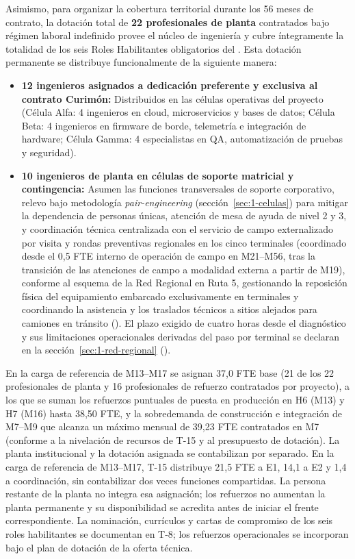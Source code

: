 \noindent Asimismo, para organizar la cobertura territorial durante los 56 meses de contrato, la dotación total de \textbf{22 profesionales de planta} contratados bajo régimen laboral indefinido provee el núcleo de ingeniería y cubre íntegramente la totalidad de los seis Roles Habilitantes obligatorios del . Esta dotación permanente se distribuye funcionalmente de la siguiente manera:
\begin{itemize}
  \item \textbf{12 ingenieros asignados a dedicación preferente y exclusiva al contrato Curimón:} Distribuidos en las células operativas del proyecto (Célula Alfa: 4 ingenieros en cloud, microservicios y bases de datos; Célula Beta: 4 ingenieros en firmware de borde, telemetría e integración de hardware; Célula Gamma: 4 especialistas en QA, automatización de pruebas y seguridad).
  \item \textbf{10 ingenieros de planta en células de soporte matricial y contingencia:} Asumen las funciones transversales de soporte corporativo, relevo bajo metodología \textit{pair-engineering} (sección~\ref{sec:1-celulas}) para mitigar la dependencia de personas únicas, atención de mesa de ayuda de nivel 2 y 3, y coordinación técnica centralizada con el servicio de campo externalizado por visita y rondas preventivas regionales en los cinco terminales (coordinado desde el 0,5 FTE interno de operación de campo en M21--M56, tras la transición de las atenciones de campo a modalidad externa a partir de M19), conforme al esquema de la Red Regional en Ruta 5, gestionando la reposición física del equipamiento embarcado exclusivamente en terminales y coordinando la asistencia y los traslados técnicos a sitios alejados para camiones en tránsito (). El plazo exigido de cuatro horas desde el diagnóstico y sus limitaciones operacionales derivadas del paso por terminal se declaran en la sección~\ref{sec:1-red-regional} ().
\end{itemize}
En la carga de referencia de M13--M17 se asignan 37,0 FTE base (21 de los 22 profesionales de planta y 16 profesionales de refuerzo contratados por proyecto), a los que se suman los refuerzos puntuales de puesta en producción en H6 (M13) y H7 (M16) hasta 38,50 FTE, y la sobredemanda de construcción e integración de M7--M9 que alcanza un máximo mensual de 39,23 FTE contratados en M7 (conforme a la nivelación de recursos de T-15 y al presupuesto de dotación). La planta institucional y la dotación asignada se contabilizan por separado. En la carga de referencia de M13--M17, T-15 distribuye 21,5 FTE a E1, 14,1 a E2 y 1,4 a coordinación, sin contabilizar dos veces funciones compartidas. La persona restante de la planta no integra esa asignación; los refuerzos no aumentan la planta permanente y su disponibilidad se acredita antes de iniciar el frente correspondiente. La nominación, currículos y cartas de compromiso de los seis roles habilitantes se documentan en T-8; los refuerzos operacionales se incorporan bajo el plan de dotación de la oferta técnica.
